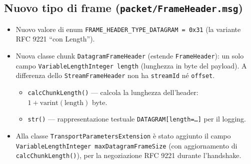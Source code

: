 \documentclass[11pt,a4paper]{article}
\newcommand{\code}[1]{\texttt{#1}}
\begin{document}
\subsection{Nuovo tipo di frame (\code{packet/FrameHeader.msg})}
\begin{itemize}[nosep,leftmargin=1.4em]
  \item Nuovo valore di enum \code{FRAME\_HEADER\_TYPE\_DATAGRAM = 0x31} (la variante RFC 9221 ``con Length'').
  \item Nuova classe chunk \code{DatagramFrameHeader} (estende \code{FrameHeader}): un solo campo
    \code{VariableLengthInteger length} (lunghezza in byte del payload). A differenza dello
    \code{StreamFrameHeader} non ha \code{streamId} n\'e \code{offset}.
    \begin{itemize}[nosep]
      \item \code{calcChunkLength()} --- calcola la lunghezza dell'header: $1 + \text{varint}(\text{length})$ byte.
      \item \code{str()} --- rappresentazione testuale \code{DATAGRAM[length=\dots]} per il logging.
    \end{itemize}
  \item Alla classe \code{TransportParametersExtension} \`e stato aggiunto il campo
    \code{VariableLengthInteger maxDatagramFrameSize} (con aggiornamento di \code{calcChunkLength()}),
    per la negoziazione RFC 9221 durante l'handshake.
\end{itemize}
\end{document}
